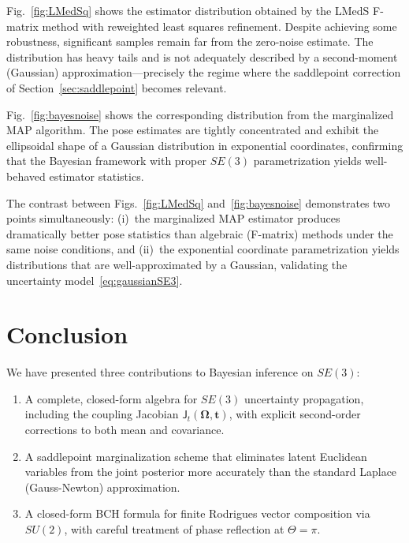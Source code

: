 \documentclass[journal]{IEEEtran}
\newcommand{\bfOmega}{\boldsymbol{\Omega}}
\begin{document}
Fig.~\ref{fig:LMedSq} shows the estimator distribution obtained 
by the LMedS F-matrix method with reweighted least squares 
refinement. Despite achieving some robustness, significant 
samples remain far from the zero-noise estimate. The 
distribution has heavy tails and is not adequately described 
by a second-moment (Gaussian) approximation---precisely the 
regime where the saddlepoint correction 
of Section~\ref{sec:saddlepoint} becomes relevant.

Fig.~\ref{fig:bayesnoise} shows the corresponding distribution 
from the marginalized MAP algorithm. The pose estimates are 
tightly concentrated and exhibit the ellipsoidal shape of a 
Gaussian distribution in exponential coordinates, confirming 
that the Bayesian framework with proper $SE(3)$ 
parametrization yields well-behaved estimator statistics.

The contrast between Figs.~\ref{fig:LMedSq} 
and~\ref{fig:bayesnoise} demonstrates two points simultaneously:
(i)~the marginalized MAP estimator produces dramatically better 
pose statistics than algebraic (F-matrix) methods under the 
same noise conditions, and (ii)~the exponential coordinate 
parametrization yields distributions that are well-approximated 
by a Gaussian, validating the uncertainty 
model~\eqref{eq:gaussianSE3}.

\section{Conclusion}
\label{sec:conclusion}

We have presented three contributions to Bayesian 
inference on $SE(3)$:

\begin{enumerate}
\item A complete, closed-form algebra for $SE(3)$ 
uncertainty propagation, including the coupling Jacobian 
$\mathsf{J}_t(\bfOmega, \mathbf{t})$, with explicit 
second-order corrections to both mean and covariance.

\item A saddlepoint marginalization scheme that 
eliminates latent Euclidean variables from the joint 
posterior more accurately than the standard Laplace 
(Gauss-Newton) approximation.

\item A closed-form BCH formula for finite Rodrigues 
vector composition via $SU(2)$, with careful treatment 
of phase reflection at $\Theta = \pi$.
\end{enumerate}
\end{document}
